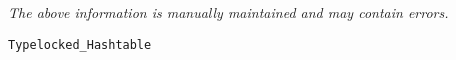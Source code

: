 \label{pkg:quickstring\_hashtable}

{\tiny \it The above information is manually maintained and may contain errors.}
\begin{verbatim}
Typelocked_Hashtable
\end{verbatim}

